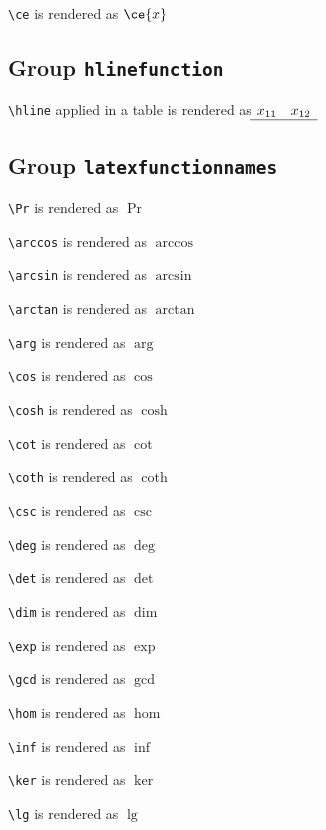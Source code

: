 \texttt{\textbackslash ce} is rendered as $\ce{x}$

\subsection{ Group \texttt{hline\textunderscore function}}

\texttt{\textbackslash hline} applied in a table is rendered as $\begin{matrix} x_{11} & x_{12} \\ \hline \end{matrix}$

\subsection{ Group \texttt{latex\textunderscore function\textunderscore names}}

\texttt{\textbackslash Pr} is rendered as $\Pr$

\texttt{\textbackslash arccos} is rendered as $\arccos$

\texttt{\textbackslash arcsin} is rendered as $\arcsin$

\texttt{\textbackslash arctan} is rendered as $\arctan$

\texttt{\textbackslash arg} is rendered as $\arg$

\texttt{\textbackslash cos} is rendered as $\cos$

\texttt{\textbackslash cosh} is rendered as $\cosh$

\texttt{\textbackslash cot} is rendered as $\cot$

\texttt{\textbackslash coth} is rendered as $\coth$

\texttt{\textbackslash csc} is rendered as $\csc$

\texttt{\textbackslash deg} is rendered as $\deg$

\texttt{\textbackslash det} is rendered as $\det$

\texttt{\textbackslash dim} is rendered as $\dim$

\texttt{\textbackslash exp} is rendered as $\exp$

\texttt{\textbackslash gcd} is rendered as $\gcd$

\texttt{\textbackslash hom} is rendered as $\hom$

\texttt{\textbackslash inf} is rendered as $\inf$

\texttt{\textbackslash ker} is rendered as $\ker$

\texttt{\textbackslash lg} is rendered as $\lg$

